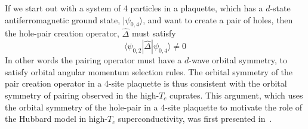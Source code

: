 If we start out with a system of 4 particles in a plaquette, which has a
$d$-state antiferromagnetic ground state, $|\psi_{0,4}\rangle$, and want to
create a pair of holes, then the hole-pair creation operator, $\hat{\Delta}$
must satisfy
\begin{equation}
  \langle \psi_{0,2} | \hat{\Delta} | \psi_{0,4} \rangle \neq 0
\end{equation}
In other words the pairing operator must have a $d$-wave orbital symmetry, to
satisfy orbital angular momentum selection rules.  The orbital symmetry of the
pair creation operator in a 4-site plaquette is thus consistent with the
orbital symmetry of pairing observed in the high-$T_{c}$ cuprates.   This
argument, which uses the orbital symmetry of the hole-pair in a 4-site
plaquette to motivate the role of the Hubbard model in high-$T_{c}$
superconductivity, was first presented in~\cite{Scalapino1996}.
 
